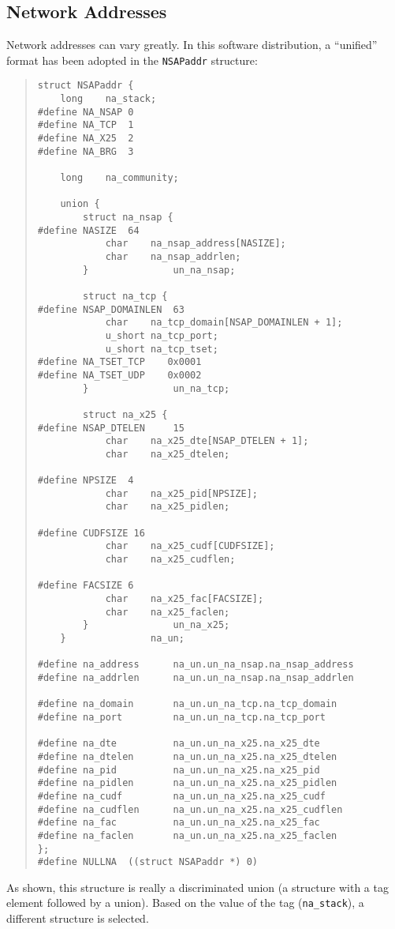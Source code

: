 \subsection	{Network Addresses}\label{nsap:addresses}
Network addresses can vary greatly.
In this software distribution,
a ``unified'' format has been adopted in the \verb"NSAPaddr" structure:
\begin{quote}\small\begin{verbatim}
struct NSAPaddr {
    long    na_stack;
#define NA_NSAP 0
#define NA_TCP  1
#define NA_X25  2
#define NA_BRG  3

    long    na_community;

    union {
        struct na_nsap {
#define NASIZE  64
            char    na_nsap_address[NASIZE];
            char    na_nsap_addrlen;
        }               un_na_nsap;

        struct na_tcp {
#define NSAP_DOMAINLEN  63
            char    na_tcp_domain[NSAP_DOMAINLEN + 1];
            u_short na_tcp_port;
            u_short na_tcp_tset;
#define NA_TSET_TCP    0x0001
#define NA_TSET_UDP    0x0002
        }               un_na_tcp;

        struct na_x25 {
#define NSAP_DTELEN     15
            char    na_x25_dte[NSAP_DTELEN + 1];
            char    na_x25_dtelen;

#define NPSIZE  4
            char    na_x25_pid[NPSIZE];
            char    na_x25_pidlen;

#define CUDFSIZE 16
            char    na_x25_cudf[CUDFSIZE];
            char    na_x25_cudflen;

#define FACSIZE 6
            char    na_x25_fac[FACSIZE];
            char    na_x25_faclen;
        }               un_na_x25;
    }               na_un;

#define na_address      na_un.un_na_nsap.na_nsap_address
#define na_addrlen      na_un.un_na_nsap.na_nsap_addrlen

#define na_domain       na_un.un_na_tcp.na_tcp_domain
#define na_port         na_un.un_na_tcp.na_tcp_port

#define na_dte          na_un.un_na_x25.na_x25_dte
#define na_dtelen       na_un.un_na_x25.na_x25_dtelen
#define na_pid          na_un.un_na_x25.na_x25_pid
#define na_pidlen       na_un.un_na_x25.na_x25_pidlen
#define na_cudf         na_un.un_na_x25.na_x25_cudf
#define na_cudflen      na_un.un_na_x25.na_x25_cudflen
#define na_fac          na_un.un_na_x25.na_x25_fac
#define na_faclen       na_un.un_na_x25.na_x25_faclen
};				   
#define NULLNA  ((struct NSAPaddr *) 0)
\end{verbatim}\end{quote}
As shown, this structure is really a discriminated union
(a structure with a tag element followed by a union).
Based on the value of the tag (\verb"na_stack"),
a different structure is selected.

